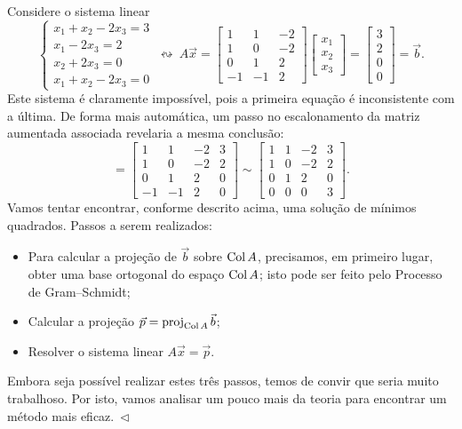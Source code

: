 \documentclass[../livro.tex]{subfiles}  %
\begin{document}
\begin{example}\label{exp:minquad1}
  Considere o sistema linear
  \begin{equation}
  \left\{
    \begin{array}{ll}
      x_1 + x_2 - 2x_3 = 3 \\
      x_1  - 2x_3 = 2 \\
      x_2 + 2x_3 = 0 \\
      x_1 + x_2 - 2x_3 = 0
    \end{array}
  \right. \ \leftrightsquigarrow  \
  A \vec{x} = \begin{bmatrix}
    1 & 1 & -2 \\ 1 & 0 & -2 \\ 0 & 1 & 2 \\ -1 & -1 & 2
  \end{bmatrix}
  \begin{bmatrix}
    x_1 \\ x_2 \\ x_3
  \end{bmatrix} =
  \begin{bmatrix}
    3 \\ 2 \\ 0 \\ 0
  \end{bmatrix} = \vec{b}.
  \end{equation} Este sistema é claramente impossível, pois a primeira equação é inconsistente com a última. De forma mais automática, um passo no escalonamento da matriz aumentada associada revelaria a mesma conclusão:
  \begin{equation}
  [\, A \ | \ \vec{b} \, ] = \begin{bmatrix}
    1 & 1 & -2 & 3 \\ 1 & 0 & -2 & 2 \\ 0 & 1 & 2 & 0 \\ -1 & -1 & 2 & 0
  \end{bmatrix}   \sim
  \begin{bmatrix}
    1 & 1 & -2 & 3 \\ 1 & 0 & -2 & 2 \\ 0 & 1 & 2 & 0 \\ 0 & 0 & 0 & 3
  \end{bmatrix} .
  \end{equation} Vamos tentar encontrar, conforme descrito acima, uma solução de mínimos quadrados. Passos a serem realizados:
  \begin{itemize}
  \item Para calcular a projeção de $\vec{b}$ sobre $\operatorname{Col} A$, precisamos, em primeiro lugar, obter uma base ortogonal do espaço $\operatorname{Col} A$; isto pode ser feito pelo Processo de Gram--Schmidt;
  \item Calcular a projeção $\vec{p} = \operatorname{proj}_{\operatorname{Col} A} \vec{b}$;
  \item Resolver o sistema linear $A \vec{x} = \vec{p}$.
  \end{itemize} Embora seja possível realizar estes três passos, temos de convir que seria muito trabalhoso. Por isto, vamos analisar um pouco mais da teoria para encontrar um método mais eficaz$. \ \lhd$
\end{example}
\end{document}
